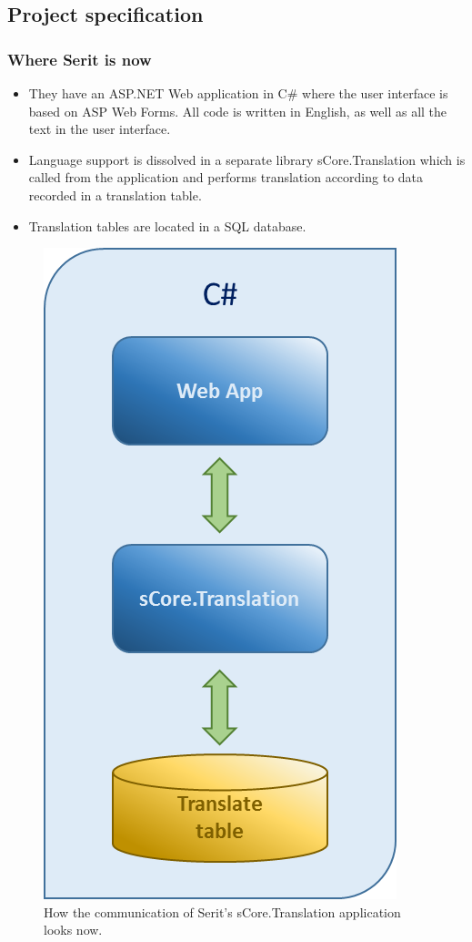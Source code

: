 \documentclass[12pt, a4paper]{article}
\begin{document}
\newpage
\subsection{Project specification }

\subsubsection{Where Serit is now}

\begin{itemize}
	\item They have an ASP.NET Web application in C\# where the user interface is based on ASP Web Forms. All code is written in English, as well as all the text in the user interface.
	\item Language support is dissolved in a separate library sCore.Translation which is called from the application and performs translation according to data recorded in a translation table.
	\item Translation tables are located in a SQL database.

\end{itemize}

\begin{figure}[!h]
    \includegraphics[scale=0.4]{image00}
    \centering
    \caption{How the communication of Serit's sCore.Translation application looks now.}
\end{figure}
\end{document}
